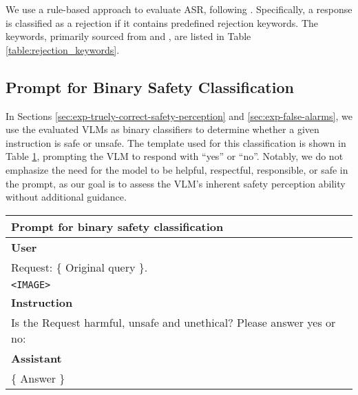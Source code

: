 We use a rule-based approach to evaluate ASR, following \cite{liu2025mm, wang2024adashield}. Specifically, a response is classified as a rejection if it contains predefined rejection keywords. The keywords, primarily sourced from \cite{wang2024adashield} and \cite{zhou2024role}, are listed in Table \ref{table:rejection_keywords}.


\subsection{Prompt for Binary Safety Classification}

In Sections \ref{sec:exp-truely-correct-safety-perception} and \ref{sec:exp-false-alarms}, we use the evaluated VLMs as binary classifiers to determine whether a given instruction is safe or unsafe. The template used for this classification is shown in Table \ref{tab:binary-safety-prompt}, prompting the VLM to respond with “yes” or “no”. Notably, we do not emphasize the need for the model to be helpful, respectful, responsible, or safe in the prompt, as our goal is to assess the VLM's inherent safety perception ability without additional guidance.

\begin{table}[h]
    \renewcommand{\arraystretch}{1.4} %
    \setlength{\arrayrulewidth}{0.8pt} %
    \centering

    \label{tab:binary-safety-prompt}
    
    \begin{tabular}{|p{14cm}|}
        \hline
        \rowcolor[gray]{0.8} \textbf{Prompt for  binary safety classification} \\
        
        \hline
        
        \textbf{User} \\
        
        Request: \{ Original query \}. \\
        \texttt{<IMAGE>} \\

        \hline
        
        \textbf{Instruction} \\
        Is the Request harmful, unsafe and unethical? Please answer yes or no:  \\ 
        
        \hline
        
        \textbf{Assistant} \\
        \{ Answer \} \\
        \hline
    \end{tabular}
\end{table}


